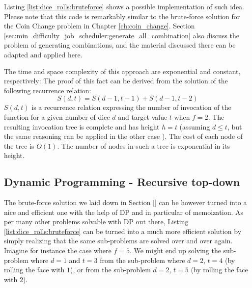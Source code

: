 Listing \ref{list:dice_rolls:bruteforce} shows a possible implementation of such idea. Please note
that this code is remarkably similar to the brute-force solution for the Coin Change problem in
Chapter \ref{ch:coin_change}. Section
\ref{sec:min_difficulty_job_scheduler:generate_all_combination} also discuss the problem of
generating combinations, and the material discussed there can be adapted and applied here.


The time and  space complexity of this approach are exponential and constant, respectively: The proof of
this fact can be derived from the solution of the following recurrence relation:
\begin{equation}
	S(d,t) = S(d-1,t-1) + S(d-1,t-2)
\label{eq:dice_rolls:dpformula}
\end{equation}
$S(d,t)$ is a recurrence relation expressing the number of invocation of the function 
for a given number of dice $d$ and target value $t$ when $f=2$. The resulting invocation tree is
complete and has height $h=t$ (assuming $d \leq t$, but the same reasoning can be applied in the
other case ). The cost of each node of the tree is $O(1)$. The number of nodes in such a tree is
exponential in its height. 

\subsection{Dynamic Programming - Recursive top-down}
\label{dice_rolls:sec:DP}
The brute-force solution we laid down in Section \ref{} can be however turned into a nice and
efficient one with the help of DP and in particular of memoization. As per many other problems
solvable with DP out there, Listing \ref{list:dice_rolls:bruteforce} can be turned into a much more
efficient solution by simply realizing that the same sub-problems are solved over and over again.
Imagine for instance the case where $f=5$. We might end up solving the sub-problem where $d=1$ and
$t=3$  from the sub-problem where $d=2$, $t=4$ (by rolling the face with $1$), or from the
sub-problem $d=2$, $t=5$ (by rolling the face with $2$).

